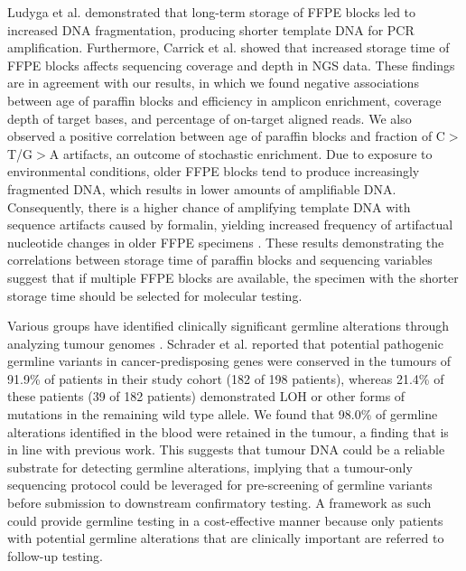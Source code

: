 \documentclass{bmcart}
\begin{document}
Ludyga et al. \cite{Ludyga2012} demonstrated that long-term storage of FFPE blocks led to increased DNA fragmentation, producing shorter template DNA for PCR amplification. Furthermore, Carrick et al. \cite{Carrick2015} showed that increased storage time of FFPE blocks affects sequencing coverage and depth in NGS data. These findings are in agreement with our results, in which we found negative associations between age of paraffin blocks and efficiency in amplicon enrichment, coverage depth of target bases, and percentage of on-target aligned reads. We also observed a positive correlation between age of paraffin blocks and fraction of C$>$T/G$>$A artifacts, an outcome of stochastic enrichment. Due to exposure to environmental conditions, older FFPE blocks tend to produce increasingly fragmented DNA, which results in lower amounts of amplifiable DNA. Consequently, there is a higher chance of amplifying template DNA with sequence artifacts caused by formalin, yielding increased frequency of artifactual nucleotide changes in older FFPE specimens \cite{Wong2014}. These results demonstrating the correlations between storage time of paraffin blocks and sequencing variables suggest that if multiple FFPE blocks are available, the specimen with the shorter storage time should be selected for molecular testing.

Various groups have identified clinically significant germline alterations through analyzing tumour genomes \cite{Schrader2015, Meric-Bernstam2016, Jones2015a, WcWhinney2009}. Schrader et al. \cite{Schrader2015} reported that potential pathogenic germline variants in cancer-predisposing genes were conserved in the tumours of 91.9\% of patients in their study cohort (182 of 198 patients), whereas 21.4\% of these patients (39 of 182 patients) demonstrated LOH or other forms of mutations in the remaining wild type allele. We found that 98.0\% of germline alterations identified in the blood were retained in the tumour, a finding that is in line with previous work. This suggests that tumour DNA could be a reliable substrate for detecting germline alterations, implying that a tumour-only sequencing protocol could be leveraged for pre-screening of germline variants before submission to downstream confirmatory testing. A framework as such could provide germline testing in a cost-effective manner because only patients with potential germline alterations that are clinically important are referred to follow-up testing.
\end{document}
